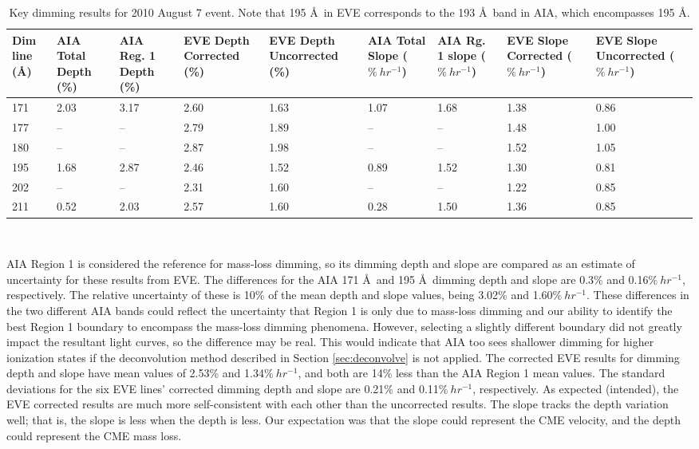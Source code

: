 \begin{table}[!h]
    \caption[Key dimming results for 2010 August 7 event]{
        Key dimming results for 2010 August 7 event. Note that 195 \AA\ in EVE corresponds to the 193 \AA\ band in AIA, 
        which encompasses 195 \AA. 
    }
    \begin{center}
    \begin{tabular}{|p{1cm}|p{1cm}|p{1.2cm}|p{1.8cm}|p{1.8cm}|p{1.4cm}|p{1.4cm}|p{1.7cm}|p{1.7cm}|} \hline
	Dim line (\AA) & AIA Total Depth (\%) & AIA Reg. 1 Depth (\%) & EVE Depth Corrected (\%) & EVE Depth Uncorrected (\%) & AIA Total Slope ($\%\ hr^{-1}$) & AIA Rg. 1 slope ($\%\ hr^{-1}$) & EVE Slope Corrected ($\%\ hr^{-1}$) & EVE Slope Uncorrected ($\%\ hr^{-1}$) \\ \hline \hline
	171 & 2.03 & 3.17 & 2.60 & 1.63 & 1.07 & 1.68 & 1.38 & 0.86 \\ \hline
	177 & -- & -- & 2.79 & 1.89 & -- & -- & 1.48 & 1.00 \\ \hline
	180 & -- & -- & 2.87 & 1.98 & -- & -- & 1.52 & 1.05 \\ \hline
	195 & 1.68 & 2.87 & 2.46 & 1.52 & 0.89 & 1.52 & 1.30 & 0.81 \\ \hline
	202 & -- & -- & 2.31 & 1.60 & -- & -- & 1.22 & 0.85 \\ \hline
	211 & 0.52 & 2.03 & 2.57 & 1.60 & 0.28 & 1.50 & 1.36 & 0.85 \\ \hline
	\end{tabular}
    \\ \rule{0mm}{5mm}
    \end{center}
    \label{tab:dimmingresults2010aug7}
\end{table} 

AIA Region 1 is considered the reference for mass-loss dimming, so its dimming depth and slope are compared as an estimate of uncertainty for these results from EVE. The differences for the AIA 171 \AA\ and 195 \AA\ dimming depth and slope are 0.3\% and 0.16$\%\ hr^{-1}$, respectively. The relative uncertainty of these is 10\% of the mean depth and slope values, being 3.02\% and 1.60$\%\ hr^{-1}$. These differences in the two different AIA bands could reflect the uncertainty that Region 1 is only due to mass-loss dimming and our ability to identify the best Region 1 boundary to encompass the mass-loss dimming phenomena. However, selecting a slightly different boundary did not greatly impact the resultant light curves, so the difference may be real. This would indicate that AIA too sees shallower dimming for higher ionization states if the deconvolution method described in Section \ref{sec:deconvolve} is not applied. The corrected EVE results for dimming depth and slope have mean values of 2.53\% and 1.34$\%\ hr^{-1}$, and both are 14\% less than the AIA Region 1 mean values. The standard deviations for the six EVE lines’ corrected dimming depth and slope are 0.21\% and 0.11$\%\ hr^{-1}$, respectively. As expected (intended), the EVE corrected results are much more self-consistent with each other than the uncorrected results. The slope tracks the depth variation well; that is, the slope is less when the depth is less. Our expectation was that the slope could represent the CME velocity, and the depth could represent the CME mass loss. 

